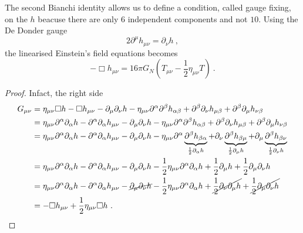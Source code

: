     The second Bianchi identity allows us to define a condition, called gauge fixing, on the $h$ beacuse there are only $6$ independent components and not $10$. Using the De Donder gauge 
    \begin{equation*}
        2 \partial^\mu h_{\mu\nu} = \partial_\nu h ~,
    \end{equation*}
    the linearised Einstein's field equations becomes
    \begin{equation*}
        - \Box h_{\mu\nu} = 16 \pi G_N (T_{\mu\nu} - \frac{1}{2} \eta_{\mu\nu} T) ~.
    \end{equation*}
    \begin{proof}
        Infact, the right side 
        \begin{equation*}
        \begin{aligned}
            G_{\mu\nu} & = \eta_{\mu\nu} \Box h - \Box h_{\mu\nu} - \partial_\mu \partial_\nu h - \eta_{\mu\nu} \partial^\alpha \partial^\beta h_{\alpha\beta}  + \partial^\beta \partial_\nu h_{\mu\beta} + \partial^\beta \partial_\mu h_{\nu\beta} \\ & = \eta_{\mu\nu} \partial^\alpha \partial_\alpha h - \partial^\alpha \partial_\alpha h_{\mu\nu} - \partial_\mu \partial_\nu h - \eta_{\mu\nu} \partial^\alpha \partial^\beta h_{\alpha\beta}  + \partial^\beta \partial_\nu h_{\mu\beta} + \partial^\beta \partial_\mu h_{\nu\beta} \\ & = \eta_{\mu\nu} \partial^\alpha \partial_\alpha h - \partial^\alpha \partial_\alpha h_{\mu\nu} - \partial_\mu \partial_\nu h - \eta_{\mu\nu} \partial^\alpha \underbrace{\partial^\beta h_{\beta\alpha}}_{\frac{1}{2} \partial_\alpha h}  + \partial_\nu \underbrace{\partial^\beta h_{\beta\mu}}_{\frac{1}{2} \partial_\mu h} +  \partial_\mu \underbrace{\partial^\beta h_{\beta\nu}}_{\frac{1}{2} \partial_\nu h} \\ & = \eta_{\mu\nu} \partial^\alpha \partial_\alpha h - \partial^\alpha \partial_\alpha h_{\mu\nu} - \partial_\mu \partial_\nu h - \frac{1}{2} \eta_{\mu\nu} \partial^\alpha \partial_\alpha h  + \frac{1}{2} \partial_\mu h + \frac{1}{2} \partial_\mu \partial_\nu h \\ & = \eta_{\mu\nu} \partial^\alpha \partial_\alpha h - \partial^\alpha \partial_\alpha h_{\mu\nu} - \cancel{\partial_\mu \partial_\nu h} - \frac{1}{2} \eta_{\mu\nu} \partial^\alpha \partial_\alpha h  + \cancel{\frac{1}{2} \partial_\nu \partial_\mu h} + \cancel{\frac{1}{2} \partial_\mu \partial_\nu h } \\ & = - \Box h_{\mu\nu} + \frac{1}{2} \eta_{\mu\nu} \Box h ~.
        \end{aligned}
        \end{equation*}


\end{proof}
